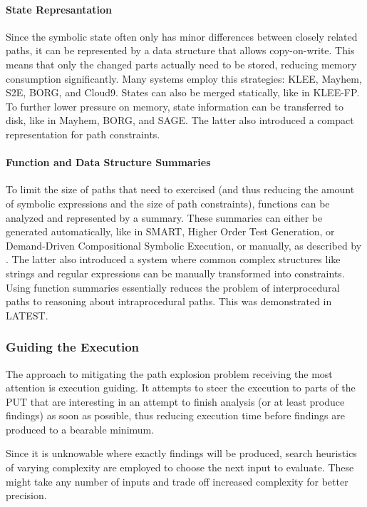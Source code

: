\documentclass{article}
\begin{document}
\begin{multicols}{2}
    \paragraph{State Represantation} Since the symbolic state often only has minor differences between closely related paths, it can be represented by a data structure that allows copy-on-write. This means that only the changed parts actually need to be stored, reducing memory consumption significantly. Many systems employ this strategies: KLEE\cite{KLEE}, Mayhem\cite{Mayhem}, S2E\cite{S2E}, BORG\cite{BORG}, and Cloud9\cite{Cloud9}. States can also be merged statically, like in KLEE-FP\cite{KLEEFP}. To further lower pressure on memory, state information can be transferred to disk, like in Mayhem\cite{Mayhem}, BORG\cite{BORG}, and SAGE\cite{SAGE}. The latter also introduced a compact representation for path constraints.\cite{SAGE}

    \paragraph{Function and Data Structure Summaries} To limit the size of paths that need to exercised (and thus reducing the amount of symbolic expressions and the size of path constraints), functions can be analyzed and represented by a summary. These summaries can either be generated automatically, like in SMART\cite{SMART}, Higher Order Test Generation\cite{HigherOrderTestGeneration}, or Demand-Driven Compositional Symbolic Execution\cite{DDCSE}, or manually, as described by \citeauthor{PFA}\cite{PFA}. The latter also introduced a system where common complex structures like strings and regular expressions can be manually transformed into constraints.\cite{PFA} Using function summaries essentially reduces the problem of interprocedural paths to reasoning about intraprocedural paths. This was demonstrated in LATEST\cite{LATEST}.

    \subsubsection{Guiding the Execution}
    The approach to mitigating the path explosion problem receiving the most attention is execution guiding. It attempts to steer the execution to parts of the PUT that are interesting in an attempt to finish analysis (or at least produce findings) as soon as possible, thus reducing execution time before findings are produced to a bearable minimum.

    Since it is unknowable where exactly findings will be produced, search heuristics of varying complexity are employed to choose the next input to evaluate. These might take any number of inputs and trade off increased complexity for better precision.


\end{multicols}
\end{document}
